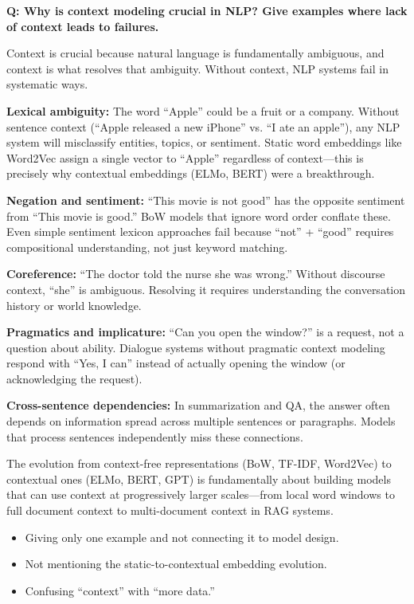 \begin{interviewq}
\textbf{Q: Why is context modeling crucial in NLP? Give examples where lack of context leads to failures.}

 \quad {} \quad \badgefreq{\freqmed}

\stronganswer
Context is crucial because natural language is fundamentally ambiguous, and context is what
resolves that ambiguity. Without context, NLP systems fail in systematic ways.

\textbf{Lexical ambiguity:} The word ``Apple'' could be a fruit or a company. Without
sentence context (``Apple released a new iPhone'' vs. ``I ate an apple''), any NLP system
will misclassify entities, topics, or sentiment. Static word embeddings like Word2Vec
assign a single vector to ``Apple'' regardless of context---this is precisely why
contextual embeddings (ELMo, BERT) were a breakthrough.

\textbf{Negation and sentiment:} ``This movie is not good'' has the opposite sentiment from
``This movie is good.'' BoW models that ignore word order conflate these. Even simple
sentiment lexicon approaches fail because ``not'' + ``good'' requires compositional
understanding, not just keyword matching.

\textbf{Coreference:} ``The doctor told the nurse she was wrong.'' Without discourse
context, ``she'' is ambiguous. Resolving it requires understanding the conversation history
or world knowledge.

\textbf{Pragmatics and implicature:} ``Can you open the window?'' is a request, not a
question about ability. Dialogue systems without pragmatic context modeling respond with
``Yes, I can'' instead of actually opening the window (or acknowledging the request).

\textbf{Cross-sentence dependencies:} In summarization and QA, the answer often depends
on information spread across multiple sentences or paragraphs. Models that process
sentences independently miss these connections.

The evolution from context-free representations (BoW, TF-IDF, Word2Vec) to contextual ones
(ELMo, BERT, GPT) is fundamentally about building models that can use context at
progressively larger scales---from local word windows to full document context to
multi-document context in RAG systems.

\redflags
\begin{itemize}
    \item Giving only one example and not connecting it to model design.
    \item Not mentioning the static-to-contextual embedding evolution.
    \item Confusing ``context'' with ``more data.''
\end{itemize}


\end{interviewq}
